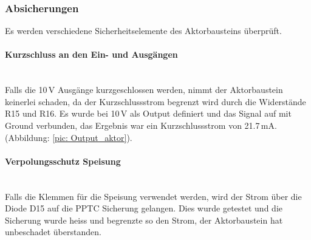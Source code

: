 \subsubsection{Absicherungen}
Es werden verschiedene Sicherheitselemente des Aktorbausteins überprüft.

\paragraph{Kurzschluss an den Ein- und Ausgängen}\\
Falls die 10\,V Ausgänge kurzgeschlossen werden, nimmt der Aktorbaustein keinerlei schaden, da der Kurzschlussstrom begrenzt wird durch die Widerstände R15 und R16. Es wurde bei 10\,V als Output definiert und das Signal auf mit Ground verbunden, das Ergebnis war ein Kurzschlussstrom von 21.7\,mA. (Abbildung: \ref{pic: Output_aktor}).

\paragraph{Verpolungsschutz Speisung}\\
Falls die Klemmen für die Speisung verwendet werden, wird der Strom über die Diode D15 auf die PPTC Sicherung gelangen. Dies wurde getestet und die Sicherung wurde heiss und begrenzte so den Strom, der Aktorbaustein hat unbeschadet überstanden.


